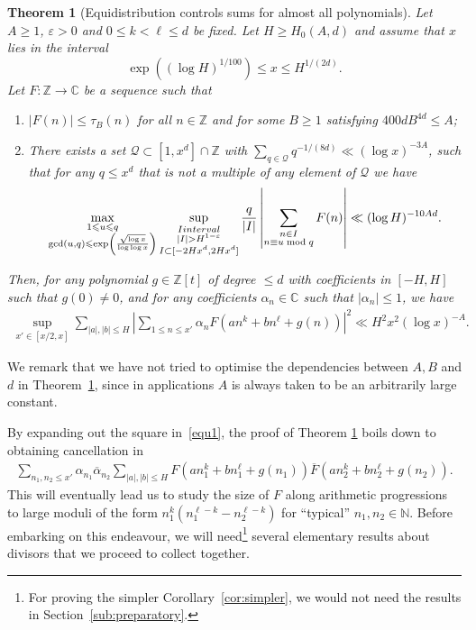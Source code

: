 \documentclass[11pt,letterpaper]{amsart}
\renewcommand{\leq}{\leqslant}
\renewcommand{\geq}{\geqslant}
\newtheorem{theorem}{Theorem}[section]
\theoremstyle{definition}
\numberwithin{equation}{section}
\newcommand\NN{\mathbb{N}}
\newcommand\CC{\mathbb{C}}
\DeclareMathOperator{\n}{N}
\newcommand{\0}{\mathbf{0}}
\begin{document}
 \begin{theorem}
[Equidistribution controls  sums for  almost all polynomials]\label{prop_general}  Let $A\geq 1$, $\varepsilon>0$  and $0\leq k< \ell \leq d$ be fixed. Let $H\geq H_0(A,d)$ and 
assume that $x$ lies in the interval
$$
\exp\left((\log H)^{1/100}\right)\leq  x\leq H^{1/(2d)}.
$$ 
Let $F:\mathbb{Z}\to \mathbb{C}$ be a sequence such that 
\begin{enumerate}

\item $|F(n)|\leq \tau_{B}(n)$ 
for all $n \in \mathbb Z$ and for
some $B\geq 1$ satisfying 
$400dB^{4d}\leq A$;   
\item There exists a set $\mathcal{Q}\subset [1,x^{d}]\cap \mathbb{Z}$ with $\sum_{q\in \mathcal{Q}}
q^{-1/(8d)}\ll (\log x)^{-3A}$,
 such that for any $q\leq x^{d}$ that is not a multiple of any element of $\mathcal{Q}$ we have
\begin{align*}
\max_{\substack{1\leq u\leq q\\ \gcd (u,q)\leq  
 \exp\left(\frac{ \sqrt{\log x}  }{    \log \log x }\right  )}}  
\sup_{\substack{
I  \textnormal{ interval } 
\\
|I|> H^{1-\varepsilon}
\\
I\subset [-2H x^d, 2H x^d]
}}
\frac{q}{|I|}
\left|\sum_{\substack{n\in I\\n\equiv u\bmod q}}F(n)\right|\ll (\log H)^{-10Ad}.
\end{align*}
\end{enumerate} 
Then, for any polynomial $g\in \mathbb{Z}[t]$ of degree $\leq d$ with coefficients in $[-H,H]$ such that   $g(0)\neq 0$, and for any coefficients  $\alpha_n\in  \CC$ such that $|\alpha_n|\leq 1$, 
we have 
\begin{align}\label{equ1}
\sup_{x'\in [x/2,x]}\sum_{|a|,|b|\leq H}\left|\sum_{1\leq n\leq x'}\alpha_nF(an^k+bn^{\ell}+g(n))\right|^2\ll H^2x^2(\log x)^{-A}.
\end{align}
\end{theorem}

We remark that we have not tried to optimise the dependencies between $A,B$ and $d$ in Theorem~\ref{prop_general}, since in applications $A$ is always taken to be an arbitrarily large constant.

By expanding out the square in~\eqref{equ1}, the proof of 
Theorem 
\ref{prop_general} boils down to obtaining cancellation in 
\begin{align*}
\sum_{n_1,n_2\leq x'}\alpha_{n_1}\overline\alpha_{n_2}\sum_{|a|,|b|\leq H}F(an_1^k+bn_1^{\ell}+g(n_1))\overline{F}(an_2^k+bn_2^{\ell}+g(n_2)).\end{align*}
This will eventually  lead us to study the size of $F$ along arithmetic progressions to large moduli of the form $n_1^k(n_1^{\ell-k} - n_2^{\ell-k})$ for ``typical'' $n_1,n_2\in \NN$.
Before embarking on this endeavour, we will need\footnote{\label{foot1}For proving the simpler Corollary~\ref{cor:simpler}, we would not need the results in Section~\ref{sub:preparatory}.} several elementary results about divisors that we proceed to collect together.
\end{document}
